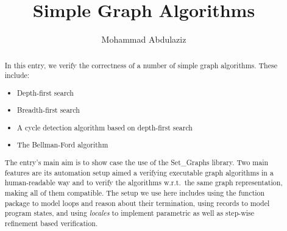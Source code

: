 \documentclass[11pt,a4paper]{article}
\begin{document}
\title{Simple Graph Algorithms}
\author{Mohammad Abdulaziz}
\maketitle

\begin{abstract}
In this entry, we verify the correctness of a number of simple graph algorithms. These include:
\begin{itemize}
  \item Depth-first search
  \item Breadth-first search
  \item A cycle detection algorithm based on depth-first search
  \item The Bellman-Ford algorithm 
\end{itemize}

The entry's main aim is to show case the use of the Set\_Graphs library. Two main features are its
automation setup aimed a verifying executable graph algorithms in a human-readable way and to verify
the algorithms w.r.t.\ the same graph representation, making all of them compatible. The setup we
use here includes using the function package to model loops and reason about their termination, using
records to model program states, and using \emph{locales} to implement parametric as well as
step-wise refinement based verification.

\end{abstract}






\end{document}
